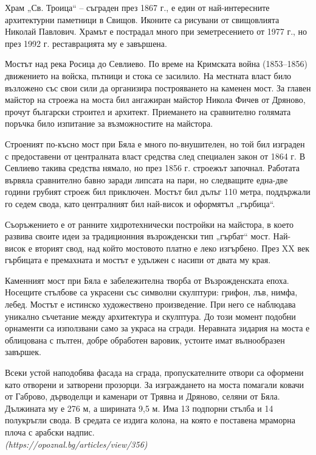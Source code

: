 \documentclass[12pt,a4paper]{article}
\begin{document}
Храм „Св. Троица“ – съграден през 1867 г., е един от най-интересните архитектурни паметници в Свищов. Иконите са рисувани от свищовлията Николай Павлович. Храмът е пострадал много при земетресението от 1977 г., но през 1992 г. реставрацията му е завършена.

Мостът над река Росица до Севлиево. По време на Кримската война (1853–1856) движението на войска, пътници и стока се засилило. На местната власт било възложено със свои сили да организира построяването на каменен мост. За главен майстор на строежа на моста бил ангажиран майстор Никола Фичев от Дряново, прочут български строител и архитект. Приемането на сравнително голямата поръчка било изпитание за възможностите на майстора.

Строеният по-късно мост при Бяла е много по-внушителен, но той бил изграден с предоставени от централната власт средства след специален закон от 1864 г. В Севлиево такива средства нямало, но през 1856 г. строежът започнал. Работата вървяла сравнително бавно заради липсата на пари, но следващите една-две години грубият строеж бил приключен. Мостът бил дълъг 110 метра, поддържали го седем свода, като централният бил най-висок и оформятъл „гърбица“.

Съоръжението е от ранните хидротехнически постройки на майстора, в което развива своите идеи за традиционния възрожденски тип „гърбат“ мост. Най-висок е вторият свод, над който мостовото платно е леко изгърбено. През XX век гърбицата е премахната и мостът е удължен с насипи от двата му края.

Каменният мост при Бяла е забележителна творба от Възрожденската епоха. Носещите стълбове са украсени със символни скулптури: грифон, лъв, нимфа, лебед. Мостът е истинско художествено произведение. При него се наблюдава уникално съчетание между архитектура и скулптура. До този момент подобни орнаменти са използвани само за украса на сгради. Неравната зидария на моста е облицована с пълтен, добре обработен варовик, устоите имат вълнообразен завършек.

Всеки устой наподобява фасада на сграда, пропускателните отвори са оформени като отворени и затворени прозорци. За изграждането на моста помагали ковачи от Габрово, дърводелци и каменари от Трявна и Дряново, селяни от Бяла. Дължината му е 276 м, а ширината 9,5 м. Има 13 подпорни стълба и 14 полукръгли свода. В средата се издига колона, на която е поставена мраморна плоча с арабски надпис. \\
\textit{(https://opoznal.bg/articles/view/356)}
\end{document}
